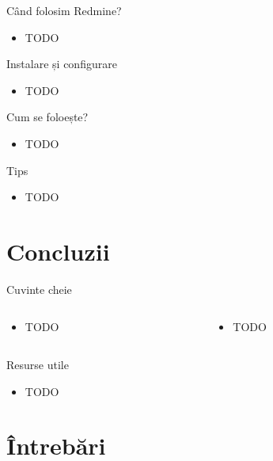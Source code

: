 \documentclass{beamer}
\begin{document}
\begin{frame}{Când folosim Redmine?}
  \begin{itemize}
    \item TODO
  \end{itemize}
\end{frame}

\begin{frame}{Instalare și configurare}
  \begin{itemize}
    \item TODO
  \end{itemize}
\end{frame}

\begin{frame}{Cum se foloește?}
  \begin{itemize}
    \item TODO
  \end{itemize}
\end{frame}

\begin{frame}{Tips}
  \begin{itemize}
    \item TODO
  \end{itemize}
\end{frame}

\section{Concluzii}

\begin{frame}{Cuvinte cheie}
  \begin{columns}
    \begin{column}[l]{0.5\textwidth}
      \begin{itemize}
        \item TODO
      \end{itemize}
    \end{column}
    \begin{column}[l]{0.5\textwidth}
      \begin{itemize}
        \item TODO
      \end{itemize}
    \end{column}
  \end{columns}
\end{frame}

\begin{frame}{Resurse utile}
  \begin{itemize}
    \small
    \item TODO
  \end{itemize}
\end{frame}

\section{Întrebări}
\end{document}

